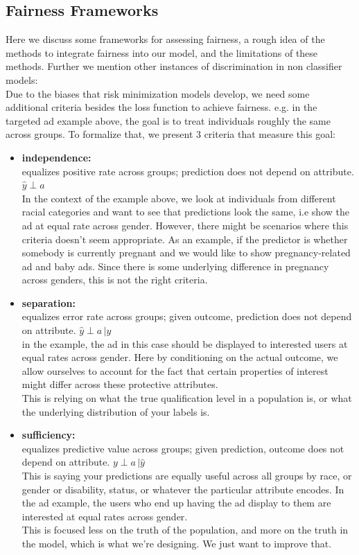 \subsection{Fairness Frameworks}

Here we discuss some frameworks for assessing fairness, a rough idea of the methods to integrate fairness into our model, and the limitations of these methods. Further we mention other instances of discrimination in non classifier models:\\
Due to the biases that risk minimization models develop, we need some additional criteria besides the loss function to achieve fairness. e.g. in the targeted ad example above, the goal is to treat individuals roughly the same across groups. To formalize that, we present 3 criteria that measure this goal:
\begin{itemize}
    \item \textbf{independence:}\\ equalizes positive rate across groups; prediction does not depend on attribute. $\hat{y} \perp a$\\
In the context of the example above, we look at individuals from different racial categories and want to see that predictions look the same, i.e show the ad at equal rate across gender. However, there might be scenarios where this criteria doesn't seem appropriate. As an example, if the predictor is whether somebody is currently pregnant and we would like to show pregnancy-related ad and baby ads. Since there is some underlying difference in pregnancy across genders, this is not the right criteria.
    \item \textbf{separation:}\\ equalizes error rate across groups; given outcome, prediction does not depend on attribute. $\hat{y}\perp a\, \vert y$\\
    in the example, the ad in this case should be displayed to interested users at equal rates across gender. Here by conditioning on the actual outcome, we allow ourselves to account for the fact that certain properties of interest might differ across these protective attributes.\\
    This is relying on what the true qualification level in a population is, or what the underlying distribution of your labels is.
    \item \textbf{sufficiency:}\\ equalizes predictive value across groups; given prediction, outcome does not depend on attribute. $y\perp a\, \vert \hat{y}$\\
    This is saying your predictions are equally useful across all groups by race, or gender or disability, status, or whatever the particular attribute encodes. In the ad example, the users who end up having the ad display to them are interested at equal rates across gender.\\
    This is focused less on the truth of the population, and more on the truth in the model, which is what we're designing. We just want to improve that.
\end{itemize}
